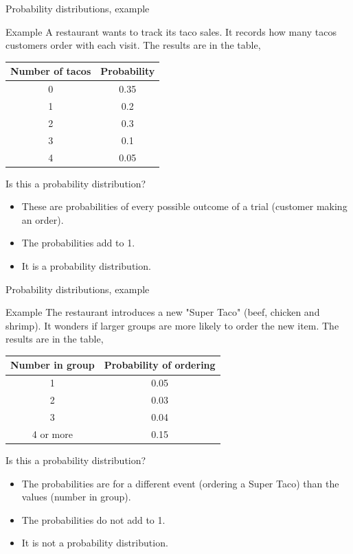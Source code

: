 \documentclass[xcolor=table]{beamer}
\begin{document}
\begin{frame}{Probability distributions, example}
\begin{exampleblock}{Example}
A restaurant wants to track its taco sales. It records how many tacos customers order with each visit. The results are in the table,\\
\medskip
{\centering \renewcommand{\arraystretch}{1}
\begin{tabular}{c | c}
Number of tacos & Probability\\
\hline
0 & 0.35\\
1 & 0.2\\
2 & 0.3\\
3 & 0.1\\
4 & 0.05
\end{tabular}\par
\renewcommand{\arraystretch}{1.5}}
\medskip
Is this a probability distribution?
\begin{itemize}
\pause\item These are probabilities of every possible outcome of a trial (customer making an order).
\pause\item The probabilities add to 1.
\pause\item It is a probability distribution.
\end{itemize}
\end{exampleblock}
\end{frame}

\begin{frame}{Probability distributions, example}
\begin{exampleblock}{Example}
The restaurant introduces a new "Super Taco" (beef, chicken and shrimp). It wonders if larger groups are more likely to order the new item. The results are in the table,\\
\medskip
{\centering \renewcommand{\arraystretch}{1}
\begin{tabular}{c | c}
Number in group & Probability of ordering \\
\hline
1 & 0.05\\
2 & 0.03\\
3 & 0.04\\
4 or more & 0.15
\end{tabular}\par
\renewcommand{\arraystretch}{1.5}}
\medskip
Is this a probability distribution?
\begin{itemize}
\pause\item The probabilities are for a different event (ordering a Super Taco) than the values (number in group). 
\pause\item The probabilities do not add to 1.
\pause\item It is not a probability distribution.
\end{itemize}
\end{exampleblock}
\end{frame}
\end{document}
